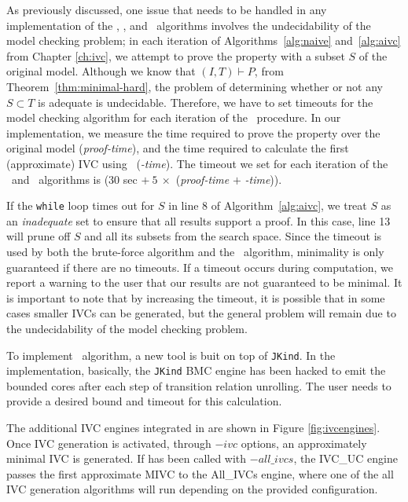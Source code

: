 As previously discussed, one issue that needs to
be handled in any implementation of the \ucalg, \ucbfalg, and \aivcalg~algorithms involves the undecidability of the model checking problem;
in each iteration of Algorithms~\ref{alg:naive} and~\ref{alg:aivc} from Chapter \ref{ch:ivc}, we attempt to prove the property with a subset $S$ of the original model.  Although we know that $(I, T) \vdash P$, from Theorem~\ref{thm:minimal-hard}, the problem of determining whether or not any $S \subset T$ is adequate is undecidable.
%
Therefore, we have to set timeouts for the model checking algorithm for each iteration of the \aivcalg\ procedure.
In our implementation, we measure the time required to prove the property over the original model (\emph{proof-time}), and the time required to calculate the first
(approximate) IVC using \ucalg\ (\emph{\ucalg-time}).
The timeout we set for each iteration of the \ucbfalg\ and \aivcalg\ algorithms is ($30$ sec  $+\ 5\ \times$ (\emph{proof-time} $+$ \emph{\ucalg-time})).

If the \texttt{while} loop times out for $S$ in line 8 of Algorithm~\ref{alg:aivc},
we treat $S$ as an \emph{inadequate} set to ensure that all results support a proof.
In this case, line 13 will prune off $S$ and all
its subsets from the search space.  Since the timeout is used by both the brute-force
algorithm and the \aivcalg\ algorithm, minimality is only guaranteed if there
are no timeouts.  If a timeout occurs during computation, we report a warning to the user that our results are not guaranteed to be minimal.
It is important to note that by increasing the timeout, it is possible that
in some cases smaller IVCs can be generated, but the general problem will remain due
to the undecidability of the model checking problem.

To implement \bvcalg\ algorithm, a new tool is buit on top of \texttt{JKind}. In the implementation, basically, the \texttt{JKind} BMC engine has been hacked to emit the bounded cores after each step of transition relation unrolling. The user needs to provide a desired bound and timeout for this calculation.

The additional IVC engines integrated in \jkind are shown in Figure \ref{fig:ivcengines}.
Once IVC generation is activated, through $-ivc$ options, an approximately minimal IVC is generated. If \jkind has been called with $-all\_ivcs$, the IVC\_UC engine passes the first approximate MIVC to the All\_IVCs engine, where one of the all IVC generation algorithms will run depending on the provided configuration.

